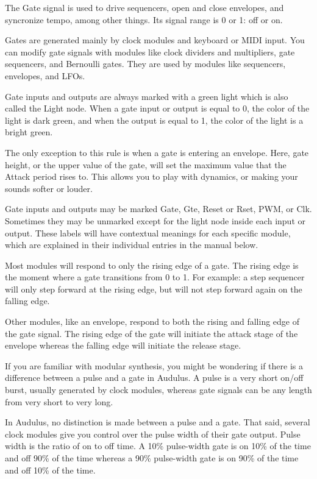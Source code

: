 \documentclass[11pt]{book}
\begin{document}
The Gate signal is used to drive sequencers, open and close envelopes, and syncronize tempo, among other things. Its signal range is 0 or 1: off or on.

Gates are generated mainly by clock modules and keyboard or MIDI input. You can modify gate signals with modules like clock dividers and multipliers, gate sequencers, and Bernoulli gates. They are used by modules like sequencers, envelopes, and LFOs.

Gate inputs and outputs are always marked with a green light which is also called the Light node. When a gate input or output is equal to 0, the color of the light is dark green, and when the output is equal to 1, the color of the light is a bright green.

The only exception to this rule is when a gate is entering an envelope. Here, gate height, or the upper value of the gate, will set the maximum value that the Attack period rises to. This allows you to play with dynamics, or making your sounds softer or louder.

Gate inputs and outputs may be marked Gate, Gte, Reset or Rset, PWM, or Clk. Sometimes they may be unmarked except for the light node inside each input or output. These labels will have contextual meanings for each specific module, which are explained in their individual entries in the manual below.

Most modules will respond to only the rising edge of a gate. The rising edge is the moment where a gate transitions from 0 to 1. For example: a step sequencer will only step forward at the rising edge, but will not step forward again on the falling edge.

Other modules, like an envelope, respond to both the rising and falling edge of the gate signal. The rising edge of the gate will initiate the attack stage of the envelope whereas the falling edge will initiate the release stage.

If you are familiar with modular synthesis, you might be wondering if there is a difference between a pulse and a gate in Audulus. A pulse is a very short on/off burst, usually generated by clock modules, whereas gate signals can be any length from very short to very long.

In Audulus, no distinction is made between a pulse and a gate. That said, several clock modules give you control over the pulse width of their gate output. Pulse width is the ratio of on to off time. A 10\% pulse-width gate is on 10\% of the time and off 90\% of the time whereas a 90\% pulse-width gate is on 90\% of the time and off 10\% of the time.
\end{document}
